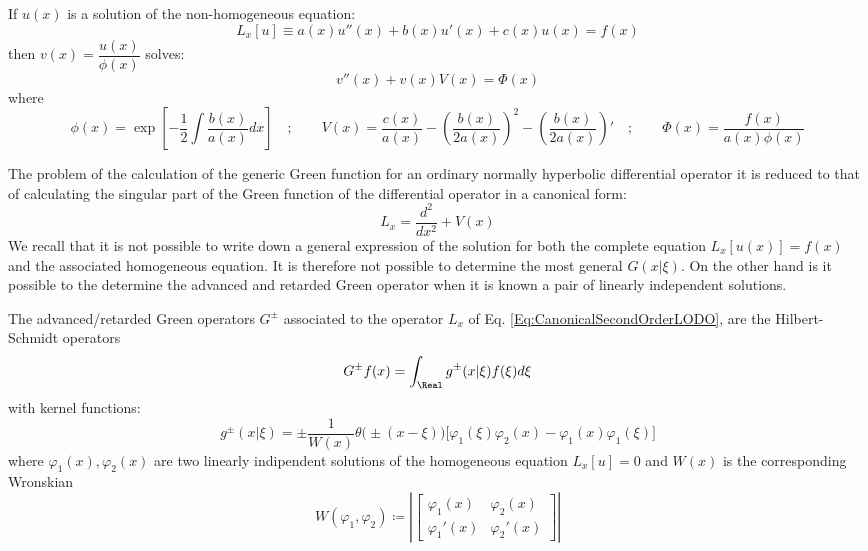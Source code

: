 \documentclass[Main]{subfiles}
\begin{document}
	\begin{proposition}
	If $u(x)$ is a solution of the non-homogeneous equation:
	\begin{displaymath}
		L_x[u] \equiv a(x) u''(x) + b(x) u'(x) + c(x) u(x) = f(x)
	\end{displaymath}
	then $v(x) =  \dfrac{u(x)}{\phi(x)}$ solves:
	\begin{displaymath}
		v''(x) +v(x) V(x) = \Phi(x)
	\end{displaymath}
	where
	\begin{displaymath}
		{\scriptstyle
		\phi(x) =  \exp \left[-\frac{1}{2}\int \frac{b(x)}{a(x)}dx \right] \quad ; \qquad
		V(x) = \frac{c(x)}{a(x)} - \left( \frac{b(x)}{2a(x)} \right)^2 - \left( \frac{b(x)}{2a(x)} \right)' \quad ; \qquad
		\Phi(x) = \frac{f(x)}{a(x) \phi(x)}}
	\end{displaymath}
	\end{proposition}
	The problem of the calculation of the generic Green function for an ordinary normally hyperbolic differential operator it is reduced to that of calculating the singular part of the Green function of the differential operator in a canonical form:
	\begin{equation}\label{Eq:CanonicalSecondOrderLODO}
		L_x=  \frac{d^2}{dx^2} + V(x)
	\end{equation}
	We recall that it is not possible to write down a general expression of the solution for both the complete equation $L_x\left[u(x)\right] = f(x)$ and the associated homogeneous equation. It is therefore not possible to determine the most general $G(x\vert \xi)$.
	On the other hand is it possible to the determine the advanced and retarded Green operator when it is known a pair of linearly independent solutions.
	\begin{proposition}
		The advanced/retarded Green operators $G^\pm$ associated to the operator $L_x$ of Eq. \ref{Eq:CanonicalSecondOrderLODO},
		are the Hilbert-Schmidt operators
		\begin{displaymath}
			G^\pm f(x) = \int_\Real g^\pm (x \vert \xi) f(\xi) d \xi
		\end{displaymath}
		with kernel functions:
		\begin{equation}\label{Eq:AdvRetGreenFunction}
			g^\pm ( x \vert \xi ) = 
			\pm \frac{1}{W(x)} \theta\big( \pm ( x-\xi) \big) \big[ \varphi_1(\xi)\varphi_2(x) - \varphi_1(x)\varphi_1(\xi) \big]
		\end{equation}
		where $\varphi_1(x) , \varphi_2(x)$ are two linearly indipendent solutions of  the homogeneous equation $L_x[u]=0$ and $W(x)$ is the corresponding Wronskian
		\begin{displaymath}
			W(\varphi_1 , \varphi_2) \coloneqq \left\vert 
				\begin{bmatrix}
        			\varphi_1(x)	&	\varphi_2(x) \\
        			\varphi_1'(x)	&	\varphi_2'(x)
     			\end{bmatrix} 
     		\right\vert
		\end{displaymath}
	\end{proposition}
\end{document}
